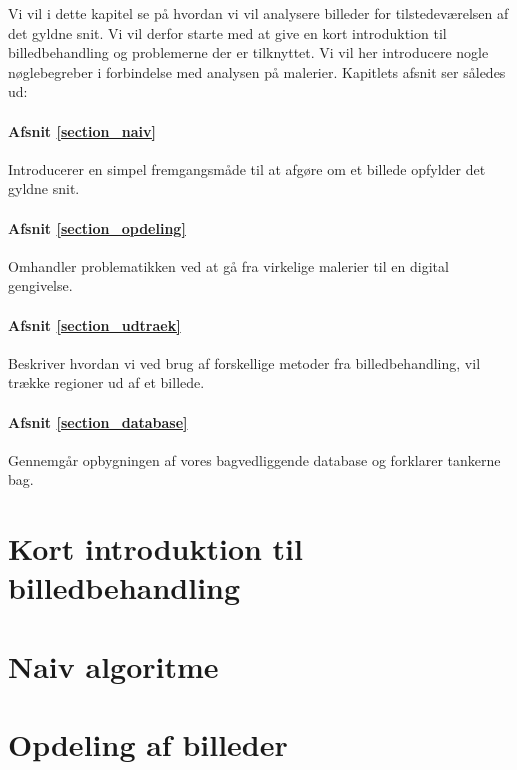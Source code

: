 {
{\sffamily Vi vil i dette kapitel se på hvordan vi vil analysere
billeder for tilstedeværelsen af det gyldne snit. Vi vil derfor starte
med at give en kort introduktion til billedbehandling og problemerne der
er tilknyttet. Vi vil her introducere nogle nøglebegreber i forbindelse
med analysen på malerier. Kapitlets afsnit ser således ud:

\paragraph{Afsnit \ref{section_naiv}} Introducerer en simpel
fremgangsmåde til at afgøre om et billede opfylder det gyldne snit.

\paragraph{Afsnit \ref{section_opdeling}} Omhandler problematikken
ved at gå fra virkelige malerier til en digital gengivelse.

\paragraph{Afsnit \ref{section_udtraek}} Beskriver hvordan vi ved brug
af forskellige metoder fra billedbehandling, vil trække regioner ud af
et billede.

\paragraph{Afsnit \ref{section_database}} Gennemgår opbygningen af vores
bagvedliggende database og forklarer tankerne bag.
}

\section{Kort introduktion til billedbehandling\label{section_kort_intro}}


\section{Naiv algoritme\label{section_naiv}}


\section{Opdeling af billeder\label{section_opdeling}}


}
